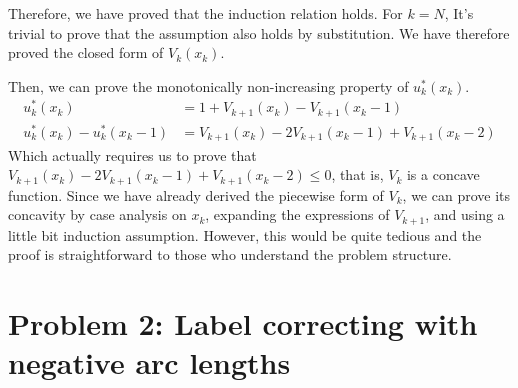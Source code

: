 \documentclass[11pt, a4paper, oneside]{memoir}
\begin{document}
Therefore, we have proved that the induction relation holds.
For $k=N$, It's trivial to prove that the assumption also holds by substitution. We have therefore proved the closed form of $V_k(x_k)$.


Then, we can prove the monotonically non-increasing property of $u_k^*(x_k)$.
\begin{align*}
  u_k^*(x_k) &= 1 + V_{k+1}(x_k) - V_{k+1}(x_k-1) \\
  u_k^*(x_k)-u_k^*(x_k-1) &= V_{k+1}(x_k) - 2V_{k+1}(x_k-1) + V_{k+1}(x_k-2)
\end{align*}
Which actually requires us to prove that $V_{k+1}(x_k) - 2V_{k+1}(x_k-1) + V_{k+1}(x_k-2) \leq 0$,
that is, $V_k$ is a concave function. Since we have already derived the piecewise form of $V_k$,
we can prove its concavity by case analysis on $x_k$, expanding the expressions of $V_{k+1}$,
and using a little bit induction assumption.
However, this would be quite tedious and the proof is straightforward to those who understand the problem structure.

\chapter{Problem 2: Label correcting with negative arc lengths}
\end{document}
